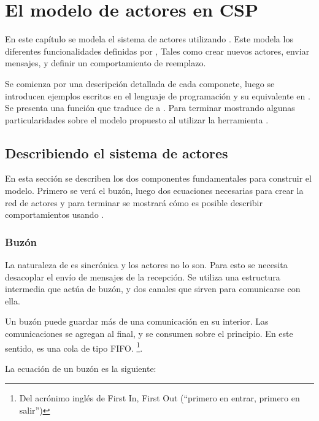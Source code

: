 \chapter{El modelo de actores en CSP}
En este capítulo se modela el sistema de actores utilizando \CSP. Este modela los diferentes funcionalidades definidas por \SAL, Tales como crear nuevos actores, enviar mensajes, y definir un comportamiento de reemplazo. 

Se comienza por una descripción detallada de cada componete, luego se introducen ejemplos escritos en el lenguaje de programación \SAL y su equivalente en \CSP. Se presenta una función que traduce de \SAL a \CSP. Para terminar mostrando algunas particularidades sobre el modelo propuesto al utilizar la herramienta \FDR.

\section{Describiendo el sistema de actores} 
En esta sección se describen los dos componentes fundamentales para construir el modelo. Primero se verá el buzón, luego dos ecuaciones necesarias para crear la red de actores y para terminar se mostrará cómo es posible describir comportamientos usando \CSP. 


\subsection{Buzón}\label{modelo:buzon}

La naturaleza de \CSP es sincrónica y los actores no lo son. Para esto se necesita desacoplar el envío de mensajes de la recepción. Se utiliza una estructura intermedia que actúa de buzón, y dos canales que sirven para comunicarse con ella.

Un buzón puede guardar más de una comunicación en su interior. Las comunicaciones se agregan al final, y se consumen sobre el principio. En este sentido, es una cola de tipo FIFO. \footnote{Del acrónimo inglés de First In, First Out (``primero en entrar, primero en salir'')}.

La ecuación de un buzón es la siguiente:

